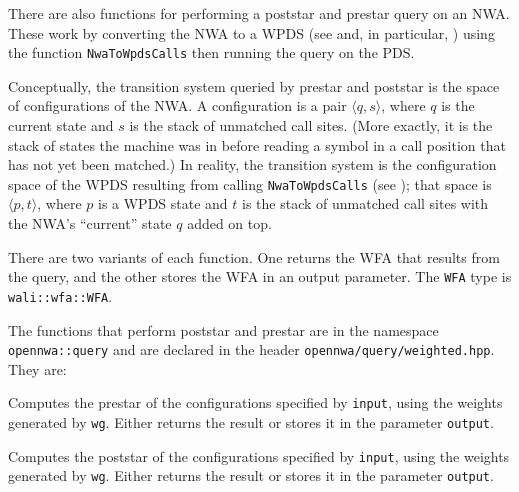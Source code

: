 There are also functions for performing a poststar and prestar
query on an NWA. These work by converting the NWA to a WPDS (see
 and, in particular, ) using
the function \texttt{NwaToWpdsCalls} then running the query on the PDS.

Conceptually, the transition system queried by prestar and poststar is the space of
configurations of the NWA. A configuration is a pair $\langle q, s\rangle$,
where $q$ is the current state and $s$ is the stack of unmatched call
sites. (More exactly, it is the stack of states the machine was in before
reading a symbol in a call position that has not yet been matched.) In
reality,  the transition system is the configuration space of the WPDS
resulting from calling \texttt{NwaToWpdsCalls} (see
); that space is
$\langle p, t\rangle$, where $p$ is a WPDS state and $t$ is the stack of
unmatched call sites with the NWA's ``current'' state $q$ added on top.

There are two variants of each function. One returns the WFA that results from
the query, and the other stores the WFA in an output parameter. The
\texttt{WFA} type is \texttt{wali::wfa::WFA}.

The functions that perform poststar and prestar are in the namespace
\texttt{opennwa::query} and are declared in the header
\texttt{opennwa/query/weighted.hpp}. They are:
\begin{functionlist}
    Computes the prestar of the configurations specified by
    \texttt{input}, using the weights generated by \texttt{wg}. Either
    returns the result or stores it in the parameter \texttt{output}.

    Computes the poststar of the configurations specified by
    \texttt{input}, using the weights generated by \texttt{wg}. Either
    returns the result or stores it in the parameter \texttt{output}.
\end{functionlist}

